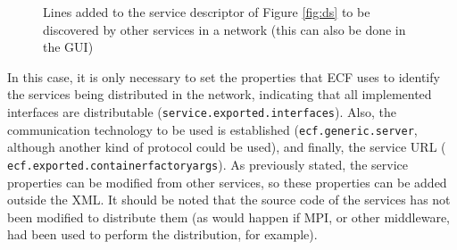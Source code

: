 \begin{figure}
\usebox{\mintedboxServer}
\caption{Lines added to the service descriptor of Figure \ref{fig:ds} to be discovered by other services in a network  (this can also be done in the GUI)} 
\label{fig:remote} %
\end{figure}

In this case, it is only necessary to set the properties that ECF uses
to identify the services being distributed in the network, indicating
that all implemented interfaces are distributable
(\texttt{ser\-vi\-ce\-.ex\-por\-ted\-.in\-ter\-fa\-ces}). Also, the
communication technology to be used is established
(\texttt{ecf\-.ge\-ne\-ric\-.ser\-ver}, although another kind of
protocol could be used), and finally, the service URL (\texttt{
  ecf\-.ex\-por\-ted\-.con\-tai\-ner\-fac\-to\-ry\-args}). As
previously stated, the service properties can be modified from other
services, so these properties  %
can be added outside the XML. It should be noted that the source code
of the services has not been modified to distribute them (as would
happen if MPI, or other middleware, had been used to perform the distribution, for
example). %











